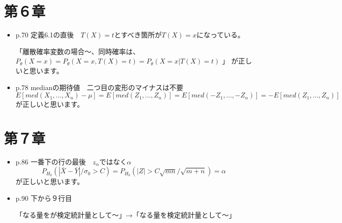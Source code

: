\documentclass[11pt,a4paper]{article}
\begin{document}
\section*{第６章}
\begin{itemize}

\item p.70 定義6.1の直後　$T(X)=t$とすべき箇所が$T(X)=x$になっている。

「離散確率変数の場合～、同時確率は、
$P_\theta (X=x) = P_\theta (X=x, T(X)=t) = P_\theta (X=x | T(X)=t)$
」
が正しいと思います。

\item p.78 medianの期待値　二つ目の変形のマイナスは不要
$$E[med(X_1, \ldots, X_n) - \mu] = E[med(Z_1, \ldots, Z_n)] = E[med(-Z_1, \ldots, -Z_n)] = -E[med(Z_1, \ldots, Z_n)]$$
が正しいと思います。

\end{itemize}

\section*{第７章}
\begin{itemize}

\item p.86 一番下の行の最後　$z_\alpha$ではなく$\alpha$
$$P_{H_0}(|\bar{X} - \bar{Y}| / \sigma_0 > C) = P_{H_0}(|Z| > C\sqrt{mn} / \sqrt{m+n}) = \alpha$$
が正しいと思います。

\item p.90 下から９行目

「なる量をが検定統計量として～」→「なる量を検定統計量として～」


\end{itemize}
\end{document}
